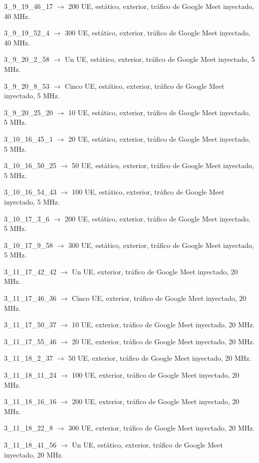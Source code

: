 \documentclass[12pt]{report} %
\begin{document}
3\_9\_19\_46\_17 $\rightarrow$ 200 UE, estático, exterior, tráfico de Google Meet inyectado, 40 MHz.

3\_9\_19\_52\_4 $\rightarrow$ 300 UE, estático, exterior, tráfico de Google Meet inyectado, 40 MHz.

3\_9\_20\_2\_58 $\rightarrow$ Un UE, estático, exterior, tráfico de Google Meet inyectado, 5 MHz.

3\_9\_20\_8\_53 $\rightarrow$ Cinco UE, estático, exterior, tráfico de Google Meet inyectado, 5 MHz.

3\_9\_20\_25\_20 $\rightarrow$ 10 UE, estático, exterior, tráfico de Google Meet inyectado, 5 MHz.

3\_10\_16\_45\_1 $\rightarrow$ 20 UE, estático, exterior, tráfico de Google Meet inyectado, 5 MHz.

3\_10\_16\_50\_25 $\rightarrow$ 50 UE, estático, exterior, tráfico de Google Meet inyectado, 5 MHz.

3\_10\_16\_54\_43 $\rightarrow$ 100 UE, estático, exterior, tráfico de Google Meet inyectado, 5 MHz.

3\_10\_17\_3\_6 $\rightarrow$ 200 UE, estático, exterior, tráfico de Google Meet inyectado, 5 MHz.

3\_10\_17\_9\_58 $\rightarrow$ 300 UE, estático, exterior, tráfico de Google Meet inyectado, 5 MHz.

3\_11\_17\_42\_42 $\rightarrow$ Un UE, exterior, tráfico de Google Meet inyectado, 20 MHz.

3\_11\_17\_46\_36 $\rightarrow$ Cinco UE, exterior, tráfico de Google Meet inyectado, 20 MHz.

3\_11\_17\_50\_37 $\rightarrow$ 10 UE, exterior, tráfico de Google Meet inyectado, 20 MHz.

3\_11\_17\_55\_46 $\rightarrow$ 20 UE, exterior, tráfico de Google Meet inyectado, 20 MHz.

3\_11\_18\_2\_37 $\rightarrow$ 50 UE, exterior, tráfico de Google Meet inyectado, 20 MHz.

3\_11\_18\_11\_24 $\rightarrow$ 100 UE, exterior, tráfico de Google Meet inyectado, 20 MHz.

3\_11\_18\_16\_16 $\rightarrow$ 200 UE, exterior, tráfico de Google Meet inyectado, 20 MHz.

3\_11\_18\_22\_8 $\rightarrow$ 300 UE, exterior, tráfico de Google Meet inyectado, 20 MHz.

3\_11\_18\_41\_56 $\rightarrow$ Un UE, estático, exterior, tráfico de Google Meet inyectado, 20 MHz.
\end{document}
